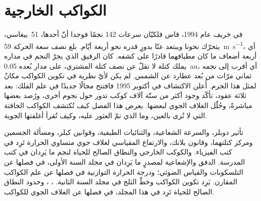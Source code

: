 \chapter{الكواكب الخارجية}\label{ch:b3:exoplanets}

في خريف عام 1994، قاس فلكيّان سرعات 142
نجمًا فوجدا أنّ أحدها، 51~بيغاسي، يتحرّك نحونا ويبتعد عنّا
بدورٍ قدره نحو أربعة أيّام. بلغ نصف سعة الحركة
\qty{59}{m.s^{-1}}، أي أربعة أضعاف ما كان مطيافهما قادرًا على كشفه.
كان الرفيق الذي يجرّ النجم في مداره يملك كتلة لا تقلّ عن نصف كتلة
المشتري، على مدار بُعده \qty{0.05}{au}، أي أقرب إلى نجمه ثماني مرّات
من بُعد عطارد عن الشمس. لم يكن لأيّ نظرية في تكوين الكواكب مكانٌ
لمثل هذا الجرم. أُعلن الاكتشاف في أكتوبر 1995 فافتتح مجالًا جديدًا في علم الفلك:
بعد ثلاثة عقود، تأكّد وجود أكثر من ستّة آلاف كوكب تدور حول
نجوم أخرى، ورُصد بعضها مباشرةً،
وحُلّل الغلاف الجوي لبعضها. يعرض هذا الفصل كيف تُكتشف الكواكب الخافتة
التي لا تُرى بالعين، وما الذي تمّ العثور عليه، وكيف تُقرأ
أغلفتها الجوية.

\begin{recall}
تأثير دوبلر، والسرعة الشعاعية، والثنائيات الطيفية، وقوانين كبلر،
ومسألة الجسمين ومركز كتلتهما، وقانون بلانك،
والارتفاع المقياسي لغلاف جوي متساوي الحرارة تَرِد في كتب الفيزياء.
والكوكب الخارجي والنطاق الصالح للحياة لنجم ما يَرِدان في كتب المدرسة.
الدفق والإشعاعية لمصدرٍ ما يَرِدان في مجلد السنة الأولى، في فصلها
عن التلسكوبات والقياس الضوئي؛ ودرجة الحرارة التوازنية في فصلها
عن علم الكواكب المقارن. يَرِد تكوين الكواكب وخطّ الثلج في مجلد السنة الثانية.
، ، وحدود
النطاق الصالح للحياة تَرِد في هذا المجلد، في فصلها عن الغلاف
الجوي للكواكب.
\end{recall}

